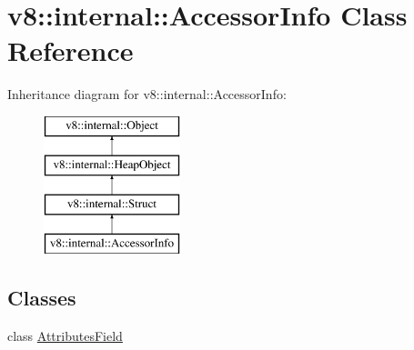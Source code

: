 \hypertarget{classv8_1_1internal_1_1_accessor_info}{}\section{v8\+:\+:internal\+:\+:Accessor\+Info Class Reference}
\label{classv8_1_1internal_1_1_accessor_info}
Inheritance diagram for v8\+:\+:internal\+:\+:Accessor\+Info\+:\begin{figure}[H]
\begin{center}
\leavevmode
\includegraphics[height=4.000000cm]{classv8_1_1internal_1_1_accessor_info}
\end{center}
\end{figure}
\subsection*{Classes}
\begin{DoxyCompactItemize}
\item 
class \hyperlink{classv8_1_1internal_1_1_accessor_info_1_1_attributes_field}{Attributes\+Field}
\end{DoxyCompactItemize}
